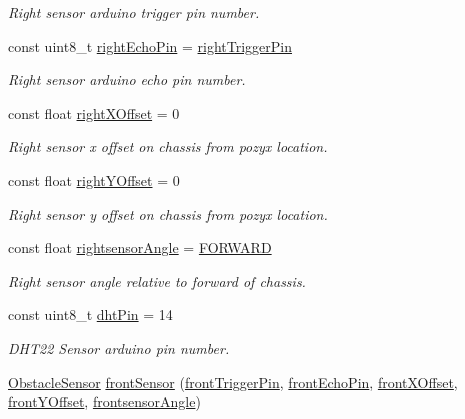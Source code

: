 \begin{DoxyCompactItemize}
\begin{DoxyCompactList}\small\item\em Right sensor arduino trigger pin number. \end{DoxyCompactList}\item 
const uint8\+\_\+t \mbox{\hyperlink{bot_main_8ino_a513a215c9894c01e37f389b072c5cec4}{right\+Echo\+Pin}} = \mbox{\hyperlink{bot_main_8ino_a906054d9d48970211789ac841d331898}{right\+Trigger\+Pin}}
\begin{DoxyCompactList}\small\item\em Right sensor arduino echo pin number. \end{DoxyCompactList}\item 
const float \mbox{\hyperlink{bot_main_8ino_ac932cddb5bc68094c96d0034c92faef9}{right\+X\+Offset}} = 0
\begin{DoxyCompactList}\small\item\em Right sensor x offset on chassis from pozyx location. \end{DoxyCompactList}\item 
const float \mbox{\hyperlink{bot_main_8ino_a07903b96b48e8e456debd9cc43c7af05}{right\+Y\+Offset}} = 0
\begin{DoxyCompactList}\small\item\em Right sensor y offset on chassis from pozyx location. \end{DoxyCompactList}\item 
const float \mbox{\hyperlink{bot_main_8ino_a83724535498f068d5b44150a2bc4fcf8}{rightsensor\+Angle}} = \mbox{\hyperlink{bot_main_8ino_a6ddfdda7a062d10cff4a72b76b44aeb8}{F\+O\+R\+W\+A\+RD}}
\begin{DoxyCompactList}\small\item\em Right sensor angle relative to forward of chassis. \end{DoxyCompactList}\item 
const uint8\+\_\+t \mbox{\hyperlink{bot_main_8ino_a89e40ffdf0114ea60292ff57879491e2}{dht\+Pin}} = 14
\begin{DoxyCompactList}\small\item\em D\+H\+T22 Sensor arduino pin number. \end{DoxyCompactList}\item 
\mbox{\hyperlink{class_obstacle_sensor}{Obstacle\+Sensor}} \mbox{\hyperlink{bot_main_8ino_a355879266d10af4a6e9126a47bc09113}{front\+Sensor}} (\mbox{\hyperlink{bot_main_8ino_a33df7a8dbfd90327fda79c01f944f56a}{front\+Trigger\+Pin}}, \mbox{\hyperlink{bot_main_8ino_a878ae4b68ec48fc902c4aa953ad565b4}{front\+Echo\+Pin}}, \mbox{\hyperlink{bot_main_8ino_abdd898a2dfa2f64e2821af36c6ed3724}{front\+X\+Offset}}, \mbox{\hyperlink{bot_main_8ino_a4919465d0182f44aa7acaa39ece1e17a}{front\+Y\+Offset}}, \mbox{\hyperlink{bot_main_8ino_ad681cfe410d5d764c513368773b9de93}{frontsensor\+Angle}})

\end{DoxyCompactItemize}
